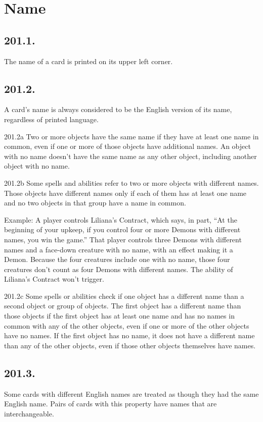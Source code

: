 \section{Name}
\subsection*{201.1.}
The name of a card is printed on its upper left corner.

\subsection*{201.2.}
A card’s name is always considered to be the English version of its name, regardless of printed language.

201.2a Two or more objects have the same name if they have at least one name in common, even if one or more of those objects have additional names. An object with no name doesn’t have the same name as any other object, including another object with no name.

201.2b Some spells and abilities refer to two or more objects with different names. Those objects have different names only if each of them has at least one name and no two objects in that group have a name in common.

Example: A player controls Liliana’s Contract, which says, in part, “At the beginning of your upkeep, if you control four or more Demons with different names, you win the game.” That player controls three Demons with different names and a face-down creature with no name, with an effect making it a Demon. Because the four creatures include one with no name, those four creatures don’t count as four Demons with different names. The ability of Liliana’s Contract won’t trigger.

201.2c Some spells or abilities check if one object has a different name than a second object or group of objects. The first object has a different name than those objects if the first object has at least one name and has no names in common with any of the other objects, even if one or more of the other objects have no names. If the first object has no name, it does not have a different name than any of the other objects, even if those other objects themselves have names.

\subsection*{201.3.}
Some cards with different English names are treated as though they had the same English name. Pairs of cards with this property have names that are interchangeable.

